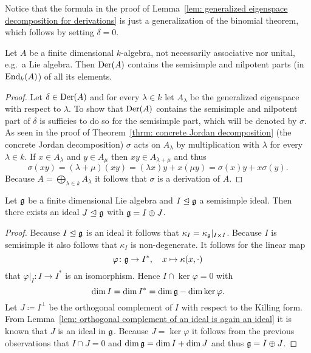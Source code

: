 \begin{rem}
 Notice that the formula in the proof of Lemma~\ref{lem: generalized eigenspace decomposition for derivations} is just a generalization of the binomial theorem, which follows by setting $\delta = 0$.
\end{rem}


\begin{lem}\label{lem: derivations contain the ss and np part of all its elements}
 Let $A$ be a finite dimensional $k$-algebra, not necessarily associative nor unital, e.g.\ a Lie algebra. Then $\operatorname{Der}(A)$ contains the semisimple and nilpotent parts (in $\operatorname{End}_k(A)$) of all its elements.
\end{lem}
\begin{proof}
 Let $\delta \in \operatorname{Der}(A)$ and for every $\lambda \in k$ let $A_\lambda$ be the generalized eigenspace with respect to $\lambda$. To show that $\operatorname{Der}(A)$ contains the semisimple and nilpotent part of $\delta$ is sufficies to do so for the semisimple part, which will be denoted by $\sigma$. As seen in the proof of Theorem~\ref{thrm: concrete Jordan decomposition} (the concrete Jordan decomposition) $\sigma$ acts on $A_\lambda$ by multiplication with $\lambda$ for every $\lambda \in k$. If $x \in A_\lambda$ and $y \in A_\mu$ then $xy \in A_{\lambda + \mu}$ and thus
 \[
  \sigma(xy)
  = (\lambda + \mu)(xy)
  = (\lambda x)y + x(\mu y)
  = \sigma(x)y + x\sigma(y).
 \]
 Because $A = \bigoplus_{\lambda \in k} A_\lambda$ it follows that $\sigma$ is a derivation of $A$.
\end{proof}


\begin{lem}\label{lem: direct complement of semisimple ideals}
 Let $\mathfrak{g}$ be a finite dimensional Lie algebra and $I \trianglelefteq \mathfrak{g}$ a semisimple ideal. Then there exists an ideal $J \trianglelefteq \mathfrak{g}$ with $\mathfrak{g} = I \oplus J$.
\end{lem}
\begin{proof}
 Because $I \trianglelefteq \mathfrak{g}$ is an ideal it follows that $\kappa_I = \kappa_{\mathfrak{g}}|_{I \times I}$. Because $I$ is semisimple it also follows that $\kappa_I$ is non-degenerate. It follows for the linear map
 \[
  \varphi \colon \mathfrak{g} \to I^*, \quad x \mapsto \kappa(x, \cdot)
 \]
 that $\varphi|_I \colon I \to I^*$ is an isomorphism. Hence $I \cap \ker \varphi = 0$ with
 \[
  \dim I = \dim I^* = \dim \mathfrak{g} - \dim \ker \varphi.
 \]
 Let $J \coloneqq I^\perp$ be the orthogonal complement of $I$ with respect to the Killing form. From Lemma~\ref{lem: orthogonal complement of an ideal is again an ideal} it is known that $J$ is an ideal in $\mathfrak{g}$. Because $J = \ker \varphi$ it follows from the previous observations that $I \cap J = 0$ and $\dim \mathfrak{g} = \dim I + \dim J$ and thus $\mathfrak{g} = I \oplus J$.
\end{proof}


